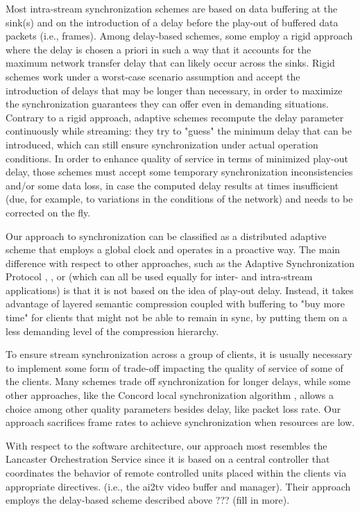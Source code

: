 \documentclass{sig-alternate}
\begin{document}
Most intra-stream synchronization schemes are based on data buffering
at the sink(s) and on the introduction of a delay before the play-out
of buffered data packets (i.e., frames).  Among delay-based schemes,
some employ a rigid \cite{} approach where the delay is chosen a
priori in such a way that it accounts for the maximum network transfer
delay that can likely occur across the sinks.  Rigid schemes work
under a worst-case scenario assumption and accept the introduction of
delays that may be longer than necessary, in order to maximize the
synchronization guarantees they can offer even in demanding
situations.  Contrary to a rigid approach, adaptive schemes \cite{ASP,
Lancaster, FSP} recompute the delay parameter continuously while
streaming: they try to "guess" the minimum delay that can be
introduced, which can still ensure synchronization under actual
operation conditions.  In order to enhance quality of service in terms
of minimized play-out delay, those schemes must accept some temporary
synchronization inconsistencies and/or some data loss, in case the
computed delay results at times insufficient (due, for example, to
variations in the conditions of the network) and needs to be corrected
on the fly.

Our approach to synchronization can be classified as a distributed
adaptive scheme that employs a global clock and operates in a
proactive way.  The main difference with respect to other approaches,
such as the Adaptive Synchronization Protocol \cite{ASP},
\cite{Gonzalez}, or \cite{Liu} (which can all be used equally for
inter- and intra-stream applications) is that it is not based on the
idea of play-out delay.  Instead, it takes advantage of layered
semantic compression coupled with buffering to "buy more time" for
clients that might not be able to remain in sync, by putting them on a
less demanding level of the compression hierarchy.

To ensure stream synchronization across a group of clients, it is
usually necessary to implement some form of trade-off impacting the
quality of service of some of the clients.  Many schemes trade off
synchronization for longer delays, while some other approaches, like
the Concord local synchronization algorithm \cite{Concord}, allows a
choice among other quality parameters besides delay, like packet loss
rate.  Our approach sacrifices frame rates to achieve synchronization
when resources are low.

With respect to the software architecture, our approach most resembles
the Lancaster Orchestration Service \cite{Lancaster} since it is based
on a central controller that coordinates the behavior of remote
controlled units placed within the clients via appropriate directives.
(i.e., the ai2tv video buffer and manager).  Their approach employs
the delay-based scheme described above ??? (fill in more).
\end{document}
